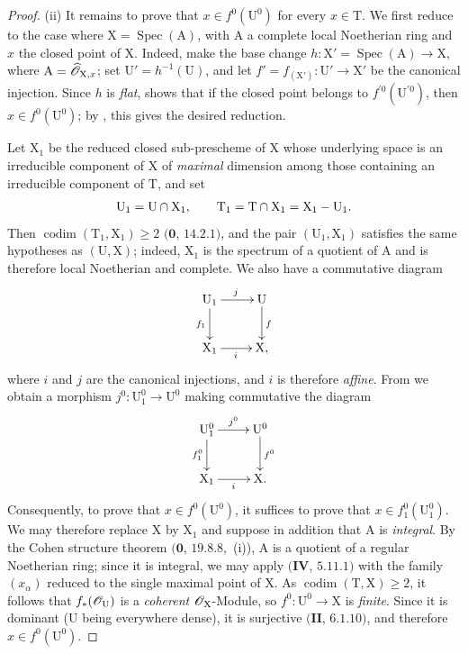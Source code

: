 \begin{proof}

(ii) It remains to prove that $x\in f^0(\mathrm{U}^0)$ for every $x\in\mathrm{T}$.
We first reduce to the case where $\mathrm{X}=\operatorname{Spec}(\mathrm{A})$, with $\mathrm{A}$ a complete local Noetherian ring and $x$ the closed point of $\mathrm{X}$.
Indeed, make the base change $h:\mathrm{X}'=\operatorname{Spec}(\mathrm{A})\to\mathrm{X}$, where $\mathrm{A}=\widehat{\mathscr{O}}_{\mathrm{X},x}$; set $\mathrm{U}'=h^{-1}(\mathrm{U})$, and let $f'=f_{(\mathrm{X}')}:\mathrm{U}'\to\mathrm{X}'$ be the canonical injection.
Since $h$ is \emph{flat},  shows that if the closed point belongs to $f^{\prime 0}(\mathrm{U}^{\prime 0})$, then $x\in f^0(\mathrm{U}^0)$; by , this gives the desired reduction.

Let $\mathrm{X}_1$ be the reduced closed sub-prescheme of $\mathrm{X}$ whose underlying space is an irreducible component of $\mathrm{X}$ of \emph{maximal} dimension among those containing an irreducible component of $\mathrm{T}$, and set
\[
  \mathrm{U}_1=\mathrm{U}\cap\mathrm{X}_1,
  \qquad
  \mathrm{T}_1=\mathrm{T}\cap\mathrm{X}_1=\mathrm{X}_1-\mathrm{U}_1.
\]
Then $\operatorname{codim}(\mathrm{T}_1,\mathrm{X}_1)\geq 2$ $(\mathbf{0}$, $14.2.1)$, and the pair $(\mathrm{U}_1,\mathrm{X}_1)$ satisfies the same hypotheses as $(\mathrm{U},\mathrm{X})$; indeed, $\mathrm{X}_1$ is the spectrum of a quotient of $\mathrm{A}$ and is therefore local Noetherian and complete.
We also have a commutative diagram
\[
  \xymatrix{
    \mathrm{U}_1 \ar[r]^j \ar[d]_{f_1} & \mathrm{U} \ar[d]^f \\
    \mathrm{X}_1 \ar[r]_i & \mathrm{X},
  }
\]
where $i$ and $j$ are the canonical injections, and $i$ is therefore \emph{affine}.  From  we obtain a morphism $j^0:\mathrm{U}_1^0\to\mathrm{U}^0$ making commutative the diagram
\[
  \xymatrix{
    \mathrm{U}_1^0 \ar[r]^{j^0} \ar[d]_{f_1^0} & \mathrm{U}^0 \ar[d]^{f^0} \\
    \mathrm{X}_1 \ar[r]_i & \mathrm{X}.
  }
\]
Consequently, to prove that $x\in f^0(\mathrm{U}^0)$, it suffices to prove that $x\in f_1^0(\mathrm{U}_1^0)$.
We may therefore replace $\mathrm{X}$ by $\mathrm{X}_1$ and suppose in addition that $\mathrm{A}$ is \emph{integral}.
By the Cohen structure theorem $(\mathbf{0}$, $19.8.8$,~(i)), $\mathrm{A}$ is a quotient of a regular Noetherian ring; since it is integral, we may apply $(\mathbf{IV}$, $5.11.1)$ with the family $(x_\alpha)$ reduced to the single maximal point of $\mathrm{X}$.
As $\operatorname{codim}(\mathrm{T},\mathrm{X})\geq 2$, it follows that $f_*(\mathscr{O}_{\mathrm{U}})$ is a \emph{coherent} $\mathscr{O}_{\mathrm{X}}$-Module, so $f^0:\mathrm{U}^0\to\mathrm{X}$ is \emph{finite}.  Since it is dominant ($\mathrm{U}$ being everywhere dense), it is surjective $(\mathbf{II}$, $6.1.10)$, and therefore $x\in f^0(\mathrm{U}^0)$.
\end{proof}

